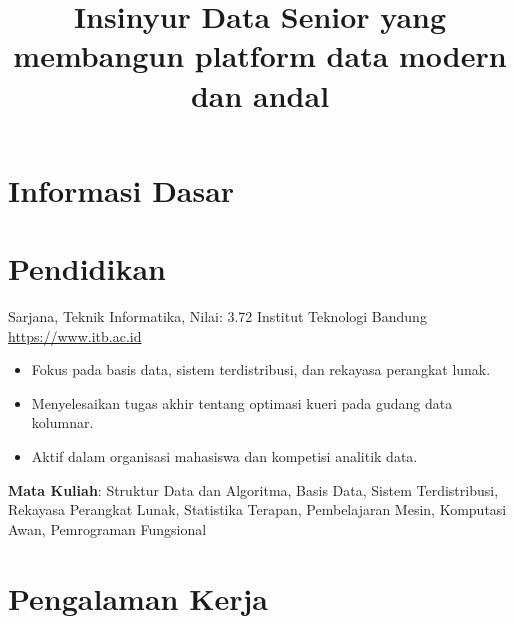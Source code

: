 \documentclass[a4paper, serif, 10pt]{moderncv}
\title{Insinyur Data Senior yang membangun platform data modern dan andal}
\begin{document}
\maketitle

\section{Informasi Dasar}

\section{Pendidikan}

        {Sarjana, Teknik Informatika, Nilai: 3.72}
        {Institut Teknologi Bandung}
        {\url{https://www.itb.ac.id}}
        {}
        {\begin{itemize}
\item Fokus pada basis data, sistem terdistribusi, dan rekayasa perangkat lunak.
\item Menyelesaikan tugas akhir tentang optimasi kueri pada gudang data kolumnar.
\item Aktif dalam organisasi mahasiswa dan kompetisi analitik data.
\end{itemize}
\textbf{Mata Kuliah}: Struktur Data dan Algoritma, Basis Data, Sistem Terdistribusi, Rekayasa Perangkat Lunak, Statistika Terapan, Pembelajaran Mesin, Komputasi Awan, Pemrograman Fungsional}
\section{Pengalaman Kerja}
\end{document}
